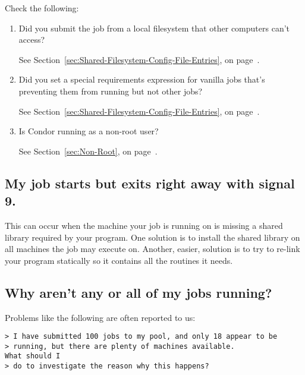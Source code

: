 Check the following:
\begin {enumerate}

\item{Did you submit the job from a local filesystem that other
computers can't access?}

See Section~\ref{sec:Shared-Filesystem-Config-File-Entries}, on
page~\pageref{sec:Shared-Filesystem-Config-File-Entries}.

\item{Did you set a special requirements expression for 
vanilla jobs that's preventing them from running but not other jobs?}

See Section~\ref{sec:Shared-Filesystem-Config-File-Entries}, on
page~\pageref{sec:Shared-Filesystem-Config-File-Entries}.

\item{Is Condor running as a non-root user?}

See Section~\ref{sec:Non-Root}, on page~\pageref{sec:Non-Root}.

\end{enumerate}

\subsection{My job starts but exits right away with signal 9.}


This can occur when the machine your job is running on is missing a
shared library required by your program.
One solution is to install the shared library on all machines the job
may execute on.
Another, easier, solution is to try to re-link your program statically
so it contains all the routines it needs.


\subsection{Why aren't any or all of my jobs running?}

Problems like the following are often reported to us:

\begin{verbatim}
> I have submitted 100 jobs to my pool, and only 18 appear to be
> running, but there are plenty of machines available.
What should I
> do to investigate the reason why this happens?
\end{verbatim}


